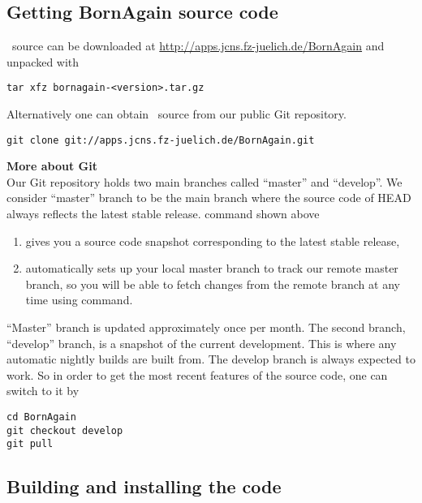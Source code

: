 \subsection{Getting {\rm\bf BornAgain} source code}
\BornAgain\ source can be downloaded at \url{http://apps.jcns.fz-juelich.de/BornAgain}
and unpacked with
\begin{lstlisting}[language=shell, style=commandline]
tar xfz bornagain-<version>.tar.gz
\end{lstlisting}

\noindent
Alternatively one can obtain \BornAgain\ source from our public Git repository.
\begin{lstlisting}[language=shell, style=commandline]
git clone git://apps.jcns.fz-juelich.de/BornAgain.git 
\end{lstlisting}
\vspace*{3mm}


\noindent
{\bf\large More about Git} \\
Our Git repository holds two main branches called ``master'' and ``develop''. We consider ``master''
branch to be the main branch where the source code of HEAD always
reflects the latest stable release.  command shown above
\begin{enumerate}[1.]
\item gives you a source code snapshot corresponding to the latest stable release,
\item automatically sets up your local master branch to track our remote master branch, 
so you will be able to fetch changes from the remote branch at any time using  command.
\end{enumerate}

``Master'' branch is updated approximately once per month.
The second branch, ``develop'' branch, is a snapshot of the current development.
This is where any automatic nightly builds are built from. The develop branch is
always expected to work. So in order to get the most recent features
of the source code, one can switch to it by
\begin{lstlisting}[language=shell, style=commandline]
cd BornAgain
git checkout develop
git pull
\end{lstlisting}
\vspace*{3mm}



\subsection{Building and installing the code}

